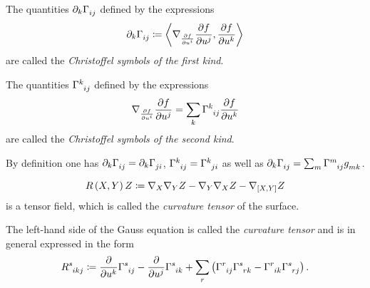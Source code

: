 \documentclass[../main.tex]{subfiles}
\begin{document}
\begin{definition}\label{Manifold:ChristoffelSymbol}
\;\newline
\begin{APAenumerate}
\item The quantities $\partial_k\tensor{\Gamma}{_i_j}$ defined by the expressions
\begin{equation*}
\partial_k\tensor{\Gamma}{_i_j}
\coloneqq
\inner{\nabla_{\frac{\partial f}{\partial\tensor{u}{^i}}}\frac{\partial f}{\partial\tensor{u}{^j}}}{\frac{\partial f}{\partial\tensor{u}{^k}}}
\end{equation*}
are called the \textit{Christoffel symbols of the first kind}.
\item The quantities $\tensor{\Gamma}{^k_i_j}$ defined by the expressions
\begin{equation*}
\nabla_{\frac{\partial f}{\partial\tensor{u}{^i}}}\frac{\partial f}{\partial\tensor{u}{^j}}
=
\sum_k{\tensor{\Gamma}{^k_i_j}\frac{\partial f}{\partial\tensor{u}{^k}}}
\end{equation*}
are called the \textit{Christoffel symbols of the second kind}.
\item By definition one has $\partial_k\tensor{\Gamma}{_i_j}=\partial_k\tensor{\Gamma}{_j_i}$, $\tensor{\Gamma}{^k_i_j}=\tensor{\Gamma}{^k_j_i}$
as well as $\partial_k\tensor{\Gamma}{_i_j}=\sum_{m}\tensor{\Gamma}{^m_i_j}\tensor{g}{_m_k}$.
\end{APAenumerate}
\end{definition}
\begin{definition}\label{Manifold:CurvatureTensor}
\begin{equation*}
R\left(X,Y\right)Z
\coloneqq
\nabla_X\nabla_YZ - \nabla_Y\nabla_XZ - \nabla_{\left[{X},{Y}\right]}Z
\end{equation*}
is a tensor field, which is called the \textit{curvature tensor} of the surface.
\end{definition}
\begin{remark}\label{Manifold:CurvatureTensor:ChristoffelSymbol}
The left-hand side of the Gauss equation is called the \textit{curvature tensor}
and is in general expressed in the form
\begin{equation*}
\tensor{R}{^s_i_k_j}
\coloneqq
\frac{\partial}{\partial\tensor{u}{^k}}\tensor{\Gamma}{^s_i_j}
- \frac{\partial}{\partial\tensor{u}{^j}}\tensor{\Gamma}{^s_i_k}
+ \sum_{r}\left(\tensor{\Gamma}{^r_i_j}\tensor{\Gamma}{^s_r_k}-\tensor{\Gamma}{^r_i_k}\tensor{\Gamma}{^s_r_j}\right) \text{.}
\end{equation*}
\end{remark}
\end{document}
